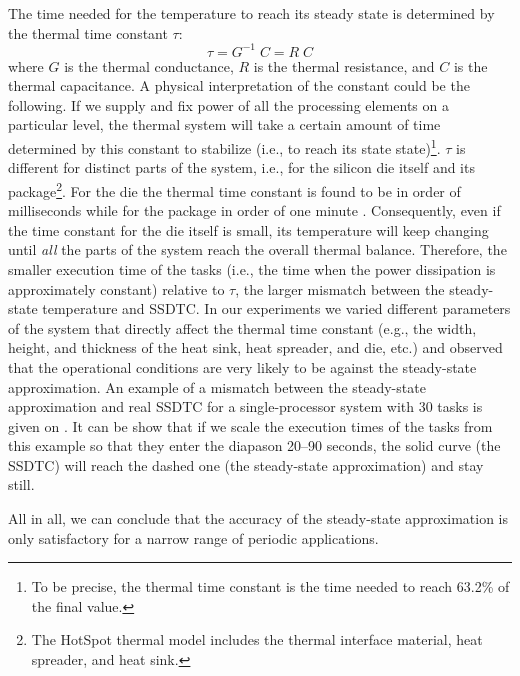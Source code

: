 The time needed for the temperature to reach its steady state is determined by the thermal time constant $\tau$:
\[
  \tau = G^{-1} \; C = R \; C
\]
where $G$ is the thermal conductance, $R$ is the thermal resistance, and $C$ is the thermal capacitance. A physical interpretation of the constant could be the following. If we supply and fix power of all the processing elements on a particular level, the thermal system will take a certain amount of time determined by this constant to stabilize (i.e., to reach its state state)\footnote{To be precise, the thermal time constant is the time needed to reach 63.2\% of the final value.}. $\tau$ is different for distinct parts of the system, i.e., for the silicon die itself and its package\footnote{The HotSpot thermal model includes the thermal interface material, heat spreader, and heat sink.}. For the die the thermal time constant is found to be in order of milliseconds while for the package in order of one minute \cite{rao2007}. Consequently, even if the time constant for the die itself is small, its temperature will keep changing until \emph{all} the parts of the system reach the overall thermal balance. Therefore, the smaller execution time of the tasks (i.e., the time when the power dissipation is approximately constant) relative to $\tau$, the larger mismatch between the steady-state temperature and SSDTC. In our experiments we varied different parameters of the system that directly affect the thermal time constant (e.g., the width, height, and thickness of the heat sink, heat spreader, and die, etc.) and observed that the operational conditions are very likely to be against the steady-state approximation. An example of a mismatch between the steady-state approximation and real SSDTC for a single-processor system with 30 tasks is given on . It can be show that if we scale the execution times of the tasks from this example so that they enter the diapason 20--90 seconds, the solid curve (the SSDTC) will reach the dashed one (the steady-state approximation) and stay still.

All in all, we can conclude that the accuracy of the steady-state approximation is only satisfactory for a narrow range of periodic applications.
